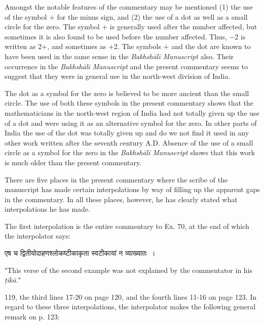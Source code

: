 \documentclass[10pt, openany]{book}
\begin{document}
{Amongst the notable features of the commentary may} 
{be mentioned (1) the use of the symbol $+$ for the minus sign,}
{and (2) the use of a dot as well as a small circle for the zero.}
{The symbol $+$ is generally used after the number affected, but}
{sometimes it is also found to be used before the number}
{affected. Thus, $-$2 is written as 2$+$, and sometimes as $+$2.}
{The symbols $+$ and the dot are known to have been used in}
{the same sense in the \textit{Bakhshālī Manuscript} also. Their occurrence in the \textit{Bakhshālī Manuscript }and the present commentary seems to suggest that they were in general use in the}
{north-west division of India.}
\vspace{3mm}

{The dot as a symbol for the zero is believed to be more}
{ancient than the small circle. The use of both these symbols}
{in the present commentary shows that the mathematicians in}
{the north-west region of India had not totally given up the use}
{of a dot and were using it as an alternative symbol for the zero.}
{In other parts of India the use of the dot was totally given up}
{and do we not find it used in any other work written after the}
{seventh century A.D. Absence of the use of a small circle as}
{a symbol for the zero in the \textit{Bakhshālī Manuscript }shows that}
{this work is much older than the present commentary.}
\vspace{3mm}

{There are five places in the present commentary where}
{the scribe of the manuscript has made certain interpolations}
{by way of filling up the apparent gaps in the commentary.}
{In all these places, however, he has clearly stated what interpolations he has made.}

\newpage

{The first interpolation is the entire commentary to Ex. 70,}
{at the end of which the interpolator says:}
\vspace{3mm}

\hspace{5mm} {\qt एष च द्वितीयोदाहणश्लोकष्टीकाकृता स्वटीकायां न व्याख्यातः~।}

 {\eqt "This verse of the second example was not explained by the commentator in his \textit{ṭikā.}"}
\vspace{3mm}

{119, the third lines 17-20 on page 120, and the fourth lines}
{11-16 on page 123. In regard to these three interpolations, the}
{interpolator makes the following general remark on p. 123:}
\vspace{3mm}
\end{document}
